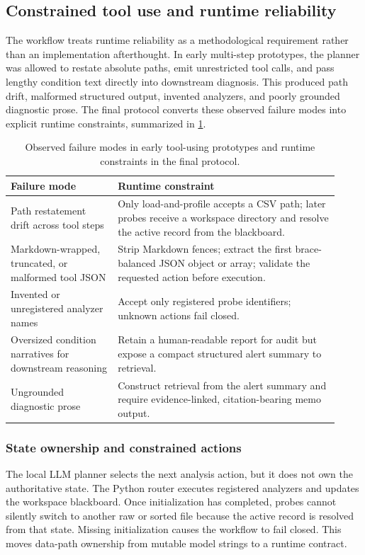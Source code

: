 \subsection{Constrained tool use and runtime reliability}
\label{sec:agent-design}

The workflow treats runtime reliability as a methodological requirement rather than an implementation afterthought. In early multi-step prototypes, the planner was allowed to restate absolute paths, emit unrestricted tool calls, and pass lengthy condition text directly into downstream diagnosis. This produced path drift, malformed structured output, invented analyzers, and poorly grounded diagnostic prose. The final protocol converts these observed failure modes into explicit runtime constraints, summarized in \cref{tab:agent-design}.

\begin{table}[H]
  \centering
  \footnotesize
  \caption{Observed failure modes in early tool-using prototypes and runtime constraints in the final protocol.}
  \label{tab:agent-design}
  \begin{tabular}{@{}p{0.30\linewidth}p{0.62\linewidth}@{}}
    \toprule
    Failure mode & Runtime constraint \\
    \midrule
    Path restatement drift across tool steps &
    Only load-and-profile accepts a CSV path; later probes receive a workspace directory and resolve the active record from the blackboard. \\
    Markdown-wrapped, truncated, or malformed tool JSON &
    Strip Markdown fences; extract the first brace-balanced JSON object or array; validate the requested action before execution. \\
    Invented or unregistered analyzer names &
    Accept only registered probe identifiers; unknown actions fail closed. \\
    Oversized condition narratives for downstream reasoning &
    Retain a human-readable report for audit but expose a compact structured alert summary to retrieval. \\
    Ungrounded diagnostic prose &
    Construct retrieval from the alert summary and require evidence-linked, citation-bearing memo output. \\
    \bottomrule
  \end{tabular}
\end{table}

\subsubsection{State ownership and constrained actions}
The local LLM planner selects the next analysis action, but it does not own the authoritative state. The Python router executes registered analyzers and updates the workspace blackboard. Once initialization has completed, probes cannot silently switch to another raw or sorted file because the active record is resolved from that state. Missing initialization causes the workflow to fail closed. This moves data-path ownership from mutable model strings to a runtime contract.

